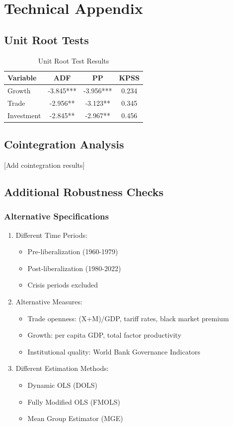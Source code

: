 \documentclass[12pt,a4paper]{article}
\theoremstyle{definition}
\begin{document}
\appendix
\section{Technical Appendix}
\subsection{Unit Root Tests}
\begin{table}[H]
\centering
\caption{Unit Root Test Results}
\begin{tabular}{lccc}
\toprule
Variable & ADF & PP & KPSS \\
\midrule
Growth & -3.845*** & -3.956*** & 0.234 \\
Trade & -2.956** & -3.123** & 0.345 \\
Investment & -2.845** & -2.967** & 0.456 \\
\bottomrule
\end{tabular}
\end{table}

\subsection{Cointegration Analysis}
[Add cointegration results]

\subsection{Additional Robustness Checks}
\subsubsection{Alternative Specifications}
\begin{enumerate}
    \item Different Time Periods:
    \begin{itemize}
        \item Pre-liberalization (1960-1979)
        \item Post-liberalization (1980-2022)
        \item Crisis periods excluded
    \end{itemize}
    
    \item Alternative Measures:
    \begin{itemize}
        \item Trade openness: (X+M)/GDP, tariff rates, black market premium
        \item Growth: per capita GDP, total factor productivity
        \item Institutional quality: World Bank Governance Indicators
    \end{itemize}
    
    \item Different Estimation Methods:
    \begin{itemize}
        \item Dynamic OLS (DOLS)
        \item Fully Modified OLS (FMOLS)
        \item Mean Group Estimator (MGE)
    \end{itemize}
\end{enumerate}
\end{document}

